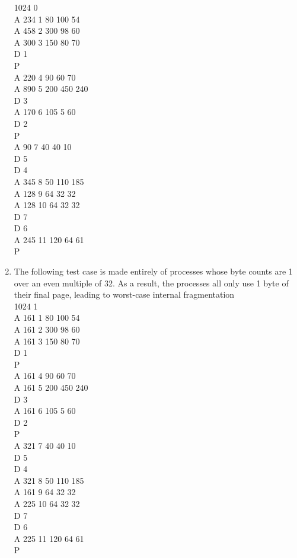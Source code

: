 \documentclass{article}
\begin{document}
\begin{enumerate}
	1024 0\\
	A 234 1 80 100 54\\
	A 458 2 300 98 60\\
	A 300 3 150 80 70\\
	D 1\\
	P\\
	A 220 4 90 60 70\\
	A 890 5 200 450 240\\
	D 3\\
	A 170 6 105 5 60\\
	D 2\\
	P\\
	A 90 7 40 40 10\\
	D 5\\
	D 4\\
	A 345 8 50 110 185\\
	A 128 9 64 32 32\\
	A 128 10 64 32 32\\
	D 7\\
	D 6\\
	A 245 11 120 64 61\\
	P\\
	\item The following test case is made entirely of processes whose byte counts are 1 over an even multiple of 32. As a result, the processes all only use 1 byte of their final page, leading to worst-case internal fragmentation\\
	1024 1\\
	A 161 1 80 100 54\\
	A 161 2 300 98 60\\
	A 161 3 150 80 70\\
	D 1\\
	P\\
	A 161 4 90 60 70\\
	A 161 5 200 450 240\\
	D 3\\
	A 161 6 105 5 60\\
	D 2\\
	P\\
	A 321 7 40 40 10\\
	D 5\\
	D 4\\
	A 321 8 50 110 185\\
	A 161 9 64 32 32\\
	A 225 10 64 32 32\\
	D 7\\
	D 6\\
	A 225 11 120 64 61\\
	P\\
\end{enumerate}
\end{document}
